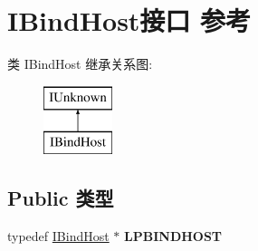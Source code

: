 \hypertarget{interface_i_bind_host}{}\section{I\+Bind\+Host接口 参考}
\label{interface_i_bind_host}
类 I\+Bind\+Host 继承关系图\+:\begin{figure}[H]
\begin{center}
\leavevmode
\includegraphics[height=2.000000cm]{interface_i_bind_host}
\end{center}
\end{figure}
\subsection*{Public 类型}
\begin{DoxyCompactItemize}
\item 
\mbox{\label{interface_i_bind_host_acbbfd82732a3e126c880222185e2ce73}} 
typedef \hyperlink{interface_i_bind_host}{I\+Bind\+Host} $\ast$ {\bfseries L\+P\+B\+I\+N\+D\+H\+O\+ST}
\end{DoxyCompactItemize}
